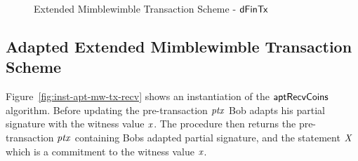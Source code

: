 \begin{landscape}
    \thispagestyle{plain}
    \begin{figure}
        \caption{Extended Mimblewimble Transaction Scheme - $\mathsf{dFinTx}$ \label{fig:ext-mim-tx-fin}}
    \end{figure}
\end{landscape}
\restoregeometry

\subsection{Adapted Extended Mimblewimble Transaction Scheme}

Figure~\ref{fig:inst-apt-mw-tx-recv} shows an instantiation of the $\mathsf{aptRecvCoins}$ algorithm. Before updating the pre-transaction $\mathit{ptx}$ Bob adapts his partial signature with the witness value $\mathit{x}$. The procedure
then returns the pre-transaction $\mathit{ptx}$ containing Bobs adapted partial signature, and the statement $\mathit{X}$ which is a commitment to the witness value $\mathit{x}$.

